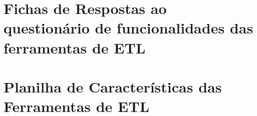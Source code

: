 \chapter{Fichas de Respostas ao questionário de funcionalidades das ferramentas de ETL}

\chapter{Planilha de Características das Ferramentas de ETL}
